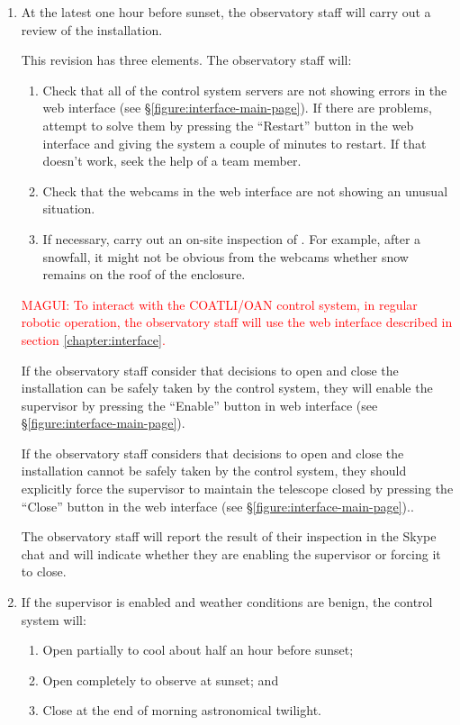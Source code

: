 \begin{enumerate}

\item At the latest one hour before sunset, the observatory staff will carry out a review of the {\projectname} installation. 

This revision has three elements. The observatory staff will:

\begin{enumerate}
\item
Check that all of the control system servers are not showing errors in the web interface (see \S\ref{figure:interface-main-page}). If there are problems, attempt to solve them by pressing the “Restart” button in the web interface and giving the system a couple of minutes to restart. If that doesn't work, seek the help of a team member.
\item
Check that the webcams in the web interface are not showing an unusual situation.
\item
If necessary, carry out an on-site inspection of {\projectname}. For example, after a snowfall, it might not be obvious from the webcams whether snow remains on the roof of the enclosure.
\end{enumerate}

\textcolor{red}{MAGUI: To interact with the COATLI/OAN control system, in regular robotic operation, the observatory staff will use the web interface described in section \ref{chapter:interface}.}

If the observatory staff consider that decisions to open and close the installation can be safely taken by the control system, they will enable the supervisor by pressing the “Enable” button in web interface (see \S\ref{figure:interface-main-page}).

If the observatory staff considers that decisions to open and close the installation cannot be safely taken by the control system, they should explicitly force the supervisor to maintain the telescope closed by pressing the “Close” button in  the web interface (see \S\ref{figure:interface-main-page}).. 

The observatory staff will report the result of their inspection in the Skype chat and will indicate whether they are enabling the supervisor or forcing it to close.

\item
If the supervisor is enabled and weather conditions are benign, the control system will:
\begin{enumerate}
\item
Open partially to cool about half an hour before sunset;
\item
Open completely to observe at sunset; and
\item
Close at the end of morning astronomical twilight.
\end{enumerate}


\end{enumerate}
